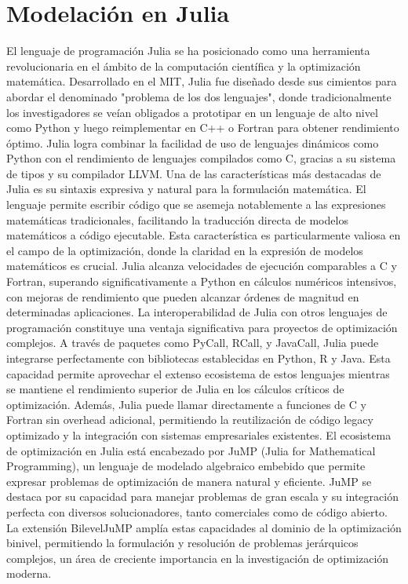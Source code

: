 \section{Modelación en Julia}

El lenguaje de programación Julia se ha posicionado como una herramienta revolucionaria en el ámbito de la computación científica y la optimización matemática. Desarrollado en el MIT, Julia fue diseñado desde sus cimientos para abordar el denominado "problema de los dos lenguajes", donde tradicionalmente los investigadores se veían obligados a prototipar en un lenguaje de alto nivel como Python y luego reimplementar en C++ o Fortran para obtener rendimiento óptimo. Julia logra combinar la facilidad de uso de lenguajes dinámicos como Python con el rendimiento de lenguajes compilados como C, gracias a su sistema de tipos y su compilador LLVM.
Una de las características más destacadas de Julia es su sintaxis expresiva y natural para la formulación matemática. El lenguaje permite escribir código que se asemeja notablemente a las expresiones matemáticas tradicionales, facilitando la traducción directa de modelos matemáticos a código ejecutable. Esta característica es particularmente valiosa en el campo de la optimización, donde la claridad en la expresión de modelos matemáticos es crucial. Julia alcanza velocidades de ejecución comparables a C y Fortran, superando significativamente a Python en cálculos numéricos intensivos, con mejoras de rendimiento que pueden alcanzar órdenes de magnitud en determinadas aplicaciones.
La interoperabilidad de Julia con otros lenguajes de programación constituye una ventaja significativa para proyectos de optimización complejos. A través de paquetes como PyCall, RCall, y JavaCall, Julia puede integrarse perfectamente con bibliotecas establecidas en Python, R y Java. Esta capacidad permite aprovechar el extenso ecosistema de estos lenguajes mientras se mantiene el rendimiento superior de Julia en los cálculos críticos de optimización. Además, Julia puede llamar directamente a funciones de C y Fortran sin overhead adicional, permitiendo la reutilización de código legacy optimizado y la integración con sistemas empresariales existentes.
El ecosistema de optimización en Julia está encabezado por JuMP (Julia for Mathematical Programming), un lenguaje de modelado algebraico embebido que permite expresar problemas de optimización de manera natural y eficiente. JuMP se destaca por su capacidad para manejar problemas de gran escala y su integración perfecta con diversos solucionadores, tanto comerciales como de código abierto. La extensión BilevelJuMP amplía estas capacidades al dominio de la optimización binivel, permitiendo la formulación y resolución de problemas jerárquicos complejos, un área de creciente importancia en la investigación de optimización moderna.

